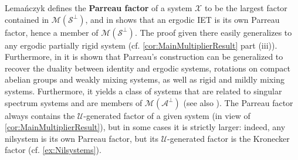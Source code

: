 \documentclass[graybox]{svmult}
\theoremstyle{definition}
\newcommand{\edit}[3]{\color{#1}{#3}\color{black}\marginpar{\textcolor{#1}{[[#2]]}}}
\newcommand{\jpm}[1]{\edit{ggreen}{JPM}{[[#1]]}}
\newcommand{\rz}[1]{\edit{orange}{RZ}{[[#1]]}}
\newcommand{\rsout}[1]{{\color{red}\sout{#1}}}
\begin{document}
Lema\'nczyk defines the \textbf{Parreau factor} of a system $\mathcal{X}$ to be the largest factor contained in $\mathscr{M}(\mathcal{S}^\perp)$, and in \cite{Lemanczyk_IET} shows that an ergodic IET is its own Parreau factor, hence a member of $\mathscr{M}(\mathcal{S}^\perp)$. 
The proof given there easily generalizes to any ergodic partially rigid system (cf. \cref{cor:MainMultiplierResult} part (iii)).
Furthermore, in \cite{Lemanczyk_IET,Lemanczyk_Parreau} it is shown that Parreau's construction can be generalized to recover the duality between identity and ergodic systems, rotations on compact abelian groups and weakly mixing systems, as well as rigid and mildly mixing systems.
Furthermore, it yields a class of systems that are related to singular spectrum systems and are members of $\mathscr{M}(\mathcal{A}^\perp)$ (see also \cite[Page 17]{Lemanczyk2009Spectral}).
The Parreau factor always contains the $\mathcal U$-generated factor of a given system (in view of \cref{cor:MainMultiplierResult}), but in some cases it is strictly larger: indeed, any nilsystem is its own Parreau factor, but its $\mathcal U$-generated factor is the Kronecker factor (cf. \cref{ex:Nilsystems}).



\end{document}
